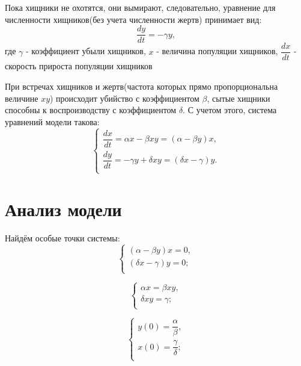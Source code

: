 \documentclass[a4paper, 14pt]{extarticle}
\begin{document}
		Пока хищники не охотятся, они вымирают, следовательно, уравнение для численности хищников(без учета численности жертв) принимает вид:
			\[ \dfrac{dy}{dt} = -\gamma y,\]
		где $\gamma$ - коэффициент убыли хищников, $x$ - величина популяции хищников, $\dfrac{dx}{dt}$ - скорость прироста популяции хищников

		При встречах хищников и жертв(частота которых прямо пропорциональна величине $xy$) происходит убийство с коэффициентом $\beta$, сытые хищники способны к воспроизводству с коэффициентом $\delta$.
		С учетом этого, система уравнений модели такова:
		\[ \begin{cases}
			\dfrac{dx}{dt} = \alpha x - \beta xy = (\alpha - \beta y)x, \\
			\dfrac{dy}{dt} = - \gamma y + \delta xy = (\delta x - \gamma)y. \\
		    \end{cases}
		 \]
		 
	\section{Анализ модели}
		Найдём особые точки системы:
		\[ \begin{cases}
			(\alpha - \beta y)x = 0, \\
			(\delta x - \gamma)y = 0; \\
		\end{cases}
		\]
		
		\[ \begin{cases}
			\alpha x = \beta xy, \\
			\delta xy = \gamma; \\
		\end{cases}
		\]
		
		\[ \begin{cases}
			y(0) = \dfrac{\alpha}{\beta}, \\
			x(0) = \dfrac{\gamma}{\delta}; \\
		\end{cases}
		\]
	
	\pagebreak
\end{document}
